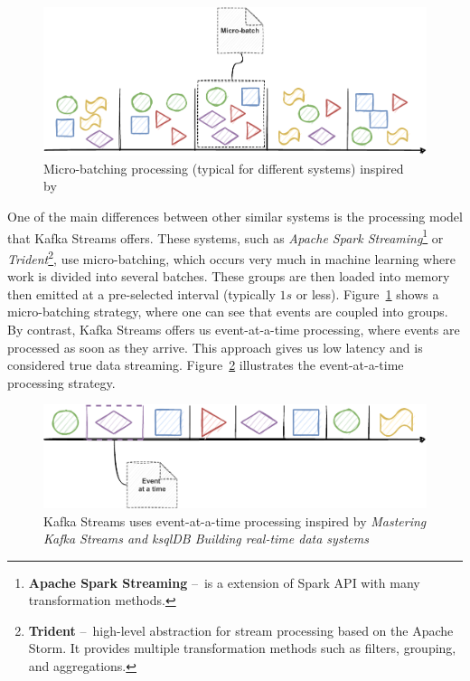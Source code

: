 \begin{figure}[!ht]
    \centering
    \includegraphics[scale=0.78]{obrazky-figures/02-preliminaries/02-kafka/10-kafkaStreamsProces}
    \caption{Micro-batching processing (typical for different systems) inspired by~\cite{kafkaStreamsBook}}
    \label{fig:02-kafkaStreamsProcessingBatch}
\end{figure}

One of the main differences between other similar systems is the processing model that Kafka Streams offers.
These systems, such as \emph{Apache Spark Streaming}\footnote{\textbf{Apache Spark Streaming} \---\ is a extension of Spark API with many transformation methods.} or \emph{Trident}\footnote{\textbf{Trident} \---\ high-level abstraction for stream processing based on the Apache Storm. It provides multiple transformation methods such as filters, grouping, and aggregations.}, use micro-batching, which occurs very much in machine learning where work is divided into several batches.
These groups are then loaded into memory then emitted at a pre-selected interval (typically $1s$ or less).
Figure~\ref{fig:02-kafkaStreamsProcessingBatch} shows a micro-batching strategy, where one can see that events are coupled into groups.
By contrast, Kafka Streams offers us event-at-a-time processing, where events are processed as soon as they arrive.
This approach gives us low latency and is considered true data streaming. Figure~\ref{fig:02-kafkaStreamsProcessingEvent} illustrates the event-at-a-time processing strategy.
\begin{figure}[!ht]
    \centering
    \includegraphics[scale=0.88]{obrazky-figures/02-preliminaries/02-kafka/11-kafkaStreamsProces2}
    \caption{Kafka Streams uses event-at-a-time processing inspired by \emph{Mastering Kafka Streams and ksqlDB Building real-time data systems}~\cite{kafkaStreamsBook}}
    \label{fig:02-kafkaStreamsProcessingEvent}
\end{figure}

